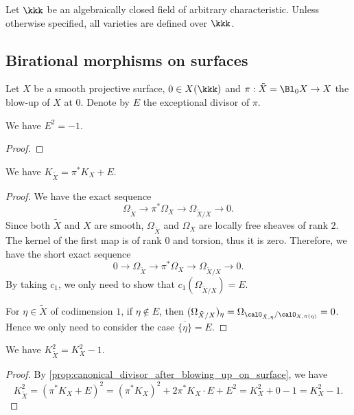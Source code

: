 Let \(\kkk\) be an algebraically closed field of arbitrary characteristic.
Unless otherwise specified, all varieties are defined over \(\kkk\).

\subsection{Birational morphisms on surfaces}

    Let \(X\) be a smooth projective surface, \(0 \in X(\kkk)\) and \(\pi:\tilde{X} = \Bl_0 X \to X\) the blow-up of \(X\) at \(0\).
    Denote by \(E\) the exceptional divisor of \(\pi\).
    
    \begin{proposition}\label{prop:self-intersection_number_of_exceptional_curve_of_blow_up}
        We have \(E^2 = -1\).
    \end{proposition}
    \begin{proof}
    \end{proof}

    \begin{proposition}%
        We have \(K_{\tilde{X}} = \pi^* K_X + E\).
    \end{proposition}
    \begin{proof}
        We have the exact sequence
        \[ \Omega_{\tilde{X}} \to \pi^* \Omega_X \to \Omega_{\tilde{X}/X} \to 0. \]
        Since both \(\tilde{X}\) and \(X\) are smooth, \(\Omega_{\tilde{X}}\) and \(\Omega_X\) are locally free sheaves of rank \(2\).
        The kernel of the first map is of rank \(0\) and torsion, thus it is zero.
        Therefore, we have the short exact sequence
        \[ 0 \to \Omega_{\tilde{X}} \to \pi^* \Omega_X \to \Omega_{\tilde{X}/X} \to 0. \]
        By taking \(c_1\), we only need to show that \(c_1(\Omega_{\tilde{X}/X}) = E\).

        For \(\eta \in \tilde{X}\) of codimension \(1\), if \(\eta \notin E\), then \((\Omega_{\tilde{X}/X})_\eta = \Omega_{\calO_{\tilde{X},\eta}/\calO_{X,\pi(\eta)}} = 0\).
        Hence we only need to consider the case \(\overline{\{\eta\}} = E\).
    \end{proof}


    \begin{corollary}%
        We have \(K_{\tilde{X}}^2 = K_X^2 - 1\).
    \end{corollary}
    \begin{proof}
        By \cref{prop:canonical_divisor_after_blowing_up_on_surface}, we have
        \[ K_{\tilde{X}}^2 = (\pi^* K_X + E)^2 = (\pi^* K_X)^2 + 2 \pi^* K_X \cdot E + E^2 = K_X^2 + 0 - 1 = K_X^2 - 1. \]
    \end{proof}
    

